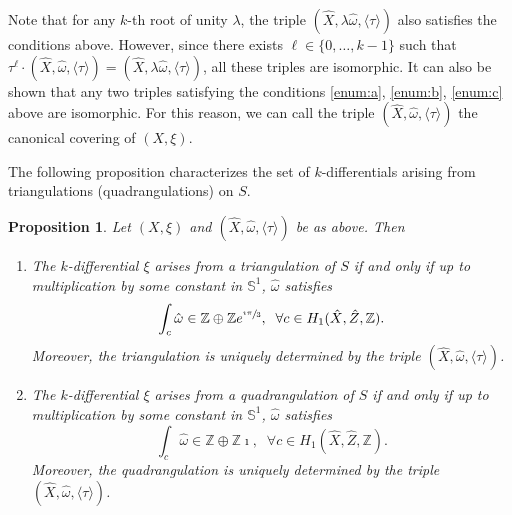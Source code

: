\documentclass[10pt]{amsart}
\newenvironment{enumeratei}
{\bgroup\def\theenumi{\roman{enumi}}\def\theenumii{\arabic{enumii}}\begin{enumerate}}
{\end{enumerate}\egroup}
\theoremstyle{plain}
\newtheorem{Proposition}[Theorem]{Proposition}
\theoremstyle{definition}
\newcommand\Z{\mathbb{Z}}
\renewcommand{\S}{\mathbb{S}}
\newcommand{\hX}{\hat{X}}
\newcommand{\homg}{\hat{\omega}}
\begin{document}
Note that for any $k$-th root of unity $\lambda$, the triple $(\hX, \lambda\homg,\langle \tau\rangle)$ also satisfies the conditions above. However, since there exists $\ell \in \{0,\dots,k-1\}$ such that $\tau^\ell\cdot(\hX,\homg,\langle \tau\rangle)=(\hX, \lambda\homg,\langle \tau\rangle)$, all these triples are isomorphic. It can also be shown that any two triples satisfying the conditions \eqref{enum:a}, \eqref{enum:b}, \eqref{enum:c} above are isomorphic.
For this reason, we can call the triple $(\hX,\homg,\langle\tau\rangle)$ the canonical covering of $(X,\xi)$.

The following proposition characterizes the set of $k$-differentials arising from triangulations (\resp quadrangulations) on $S$.
\begin{Proposition}\label{prop:reg:tiled:surface}
Let $(X,\xi)$ and $(\hX,\homg,\langle \tau \rangle)$ be as above. Then
\begin{enumeratei}
\item
The $k$-differential $\xi$ arises from a triangulation of $S$ if and only if up to multiplication by some constant in $\S^1$, $\homg$ satisfies
\begin{equation}\label{eq:cond:kdiff:triang}
\int_c\hat{\omega} \in \Z\oplus\Z e^{\sfrac{\imath\pi}{3}}, \; \; \forall c\in H_1(\hat{X},\hat{Z},\Z).
\end{equation}
Moreover, the triangulation is uniquely determined by the triple $(\hat{X},\hat{\omega},\langle\tau\rangle)$.

\item
The $k$-differential $\xi$ arises from a quadrangulation of $S$ if and only if up to multiplication by some constant in $\S^1$, $\homg$ satisfies
\begin{equation}\label{eq:cond:kdiff:quad}
\int_c\hat{\omega} \in \Z\oplus\Z\imath, \; \; \forall c\in H_1(\hat{X},\hat{Z},\Z).
\end{equation}
Moreover, the quadrangulation is uniquely determined by the triple $(\hat{X},\hat{\omega},\langle\tau\rangle)$.
\end{enumeratei}
\end{Proposition}
\end{document}
